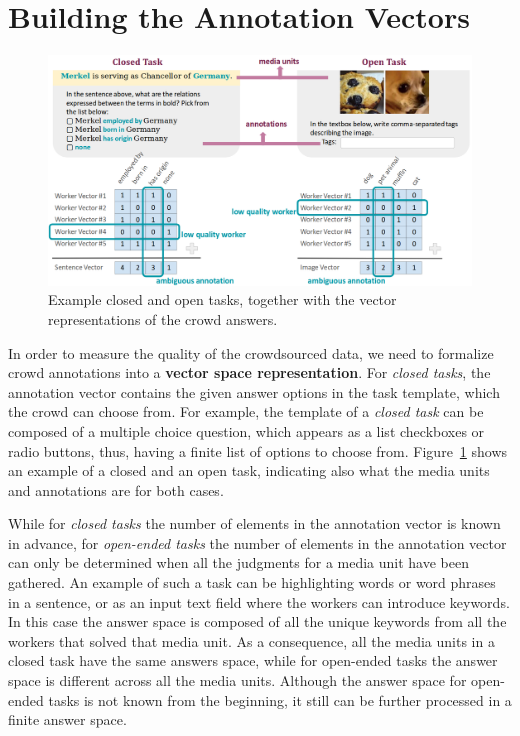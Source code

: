 \section{Building the Annotation Vectors}
\label{app:vec}

\begin{figure}[!htb]
 	\centering
 	\includegraphics[width=\linewidth]{img/closed_open_task.png}
 	\caption{Example closed and open tasks, together with the vector representations of the crowd answers.}
 	\label{fig:tasks}
 \end{figure}

In order to measure the quality of the crowdsourced data, we need to formalize crowd annotations into a \textbf{vector space representation}. For \emph{closed tasks}, the annotation vector contains the given answer options in the task template, which the crowd can choose from. For example, the template of a \emph{closed task} can be composed of a multiple choice question, which appears as a list checkboxes or radio buttons, thus, having a finite list of options to choose from. Figure~\ref{fig:tasks} shows an example of a closed and an open task, indicating also what the media units and annotations are for both cases.

While for \emph{closed tasks} the number of elements in the annotation vector is known in advance, for \emph{open-ended tasks} the number of elements in the annotation vector can only be determined when all the judgments for a media unit have been gathered. An example of such a task can be highlighting words or word phrases in a sentence, or as an input text field where the workers can introduce keywords. In this case the answer space is composed of all the unique keywords from all the workers that solved that media unit. As a consequence, all the media units in a closed task have the same answers space, while for open-ended tasks the answer space is different across all the media units. Although the answer space for open-ended tasks is not known from the beginning, it still can be further processed in a finite answer space.

